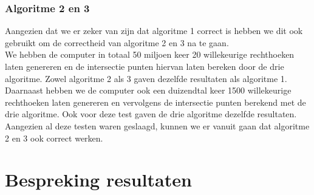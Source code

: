 \documentclass[11pt,a4paper,titlepage]{article}
\begin{document}
			\subsubsection{Algoritme 2 en 3}
				Aangezien dat we er zeker van zijn dat algoritme 1 correct is hebben we dit ook gebruikt om de correctheid van algoritme 2 en 3 na te gaan.\\
				We hebben de computer in totaal 50 miljoen keer 20 willekeurige rechthoeken laten genereren en de intersectie punten hiervan laten bereken door de drie algoritme. Zowel algoritme 2 als 3 gaven dezelfde resultaten als algoritme 1. \\
				Daarnaast hebben we de computer ook een duizendtal keer 1500 willekeurige rechthoeken laten genereren en vervolgens de intersectie punten berekend met de drie algoritme. Ook voor deze test gaven de drie algoritme dezelfde resultaten.\\
				 Aangezien al deze testen waren geslaagd, kunnen we er vanuit gaan dat algoritme 2 en 3 ook correct werken.
	
				
			
			
	\section{Bespreking resultaten}
	
\end{document}
